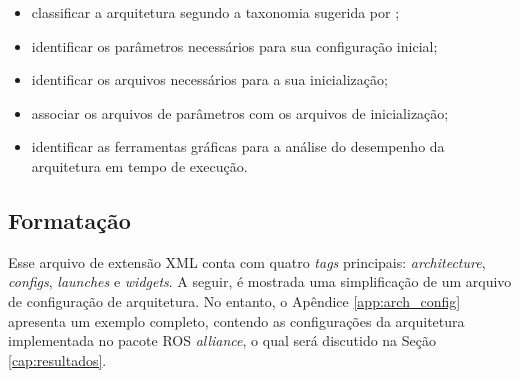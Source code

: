         \begin{itemize}
            \item classificar a arquitetura segundo a taxonomia sugerida por ;
            \item identificar os parâmetros necessários para sua configuração inicial;
            \item identificar os arquivos necessários para a sua inicialização;
            \item associar os arquivos de parâmetros com os arquivos de inicialização;
            \item identificar as ferramentas gráficas para a análise do desempenho da arquitetura em tempo de execução.
        \end{itemize}
        
        \subsection{Formatação} \label{subsec:arch_config_fmt}
            Esse arquivo de extensão XML conta com quatro \textit{tags} principais: \textit{architecture}, \textit{configs}, \textit{launches} e \textit{widgets}. A seguir, é mostrada uma simplificação de um arquivo de configuração de arquitetura. No entanto, o Apêndice \ref{app:arch_config} apresenta um exemplo completo, contendo as configurações da arquitetura implementada no pacote ROS \textit{alliance}, o qual será discutido na Seção \ref{cap:resultados}.
            
